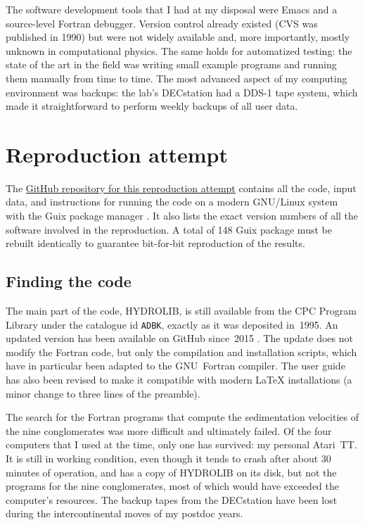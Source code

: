 The software development tools that I had at my disposal were Emacs and a source-level Fortran debugger. Version control already existed (CVS was published in 1990) but were not widely available and, more importantly, mostly unknown in computational physics. The same holds for automatized testing: the state of the art in the field was writing small example programs and running them manually from time to time. The most advanced aspect of my computing environment was backups: the lab's DECstation had a DDS-1 tape system, which made it straightforward to perform weekly backups of all user data.

\section*{Reproduction attempt}

The \href{https://github.com/khinsen/rescience-ten-year-challenge-paper-4}{GitHub repository for this reproduction attempt} contains all the code, input data, and instructions for running the code on a modern GNU/Linux system with the Guix package manager \cite{CourtesReproducibleUserControlledSoftware2015,WurmusPiGxreproduciblegenomics2018}. It also lists the exact version numbers of all the software involved in the reproduction. A total of 148 Guix package must be rebuilt identically to guarantee bit-for-bit reproduction of the results.

\subsection*{Finding the code}

The main part of the code, HYDROLIB, is still available from the CPC Program Library \cite{CPCInternationalProgram2016} under the catalogue id \texttt{ADBK}, exactly as it was deposited in~1995. An updated version has been available on GitHub since~2015 \cite{HYDROLIB}. The update does not modify the Fortran code, but only the compilation and installation scripts, which have in particular been adapted to the GNU~Fortran compiler. The user guide has also been revised to make it compatible with modern LaTeX installations (a minor change to three lines of the preamble).

The search for the Fortran programs that compute the sedimentation velocities of the nine conglomerates was more difficult and ultimately failed. Of the four computers that I used at the time, only one has survived: my personal Atari~TT. It is still in working condition, even though it tends to crash after about 30 minutes of operation, and has a copy of HYDROLIB on its disk, but not the programs for the nine conglomerates, most of which would have exceeded the computer's resources. The backup tapes from the DECstation have been lost during the intercontinental moves of my postdoc years.

